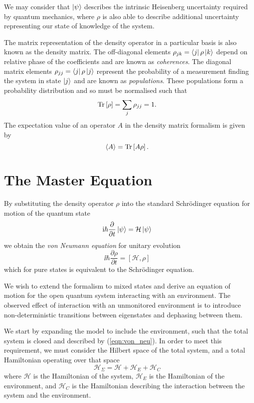     We may consider that $\Ket{\psi}$ describes the intrinsic Heisenberg
    uncertainty required by quantum mechanics, where $\rho$ is also able to
    describe additional uncertainty representing our state of knowledge of the
    system.\cite{Steck2007}

    The matrix representation of the density operator in a particular basis is
    also known as the density matrix. The off-diagonal elements $\rho_{jk} =
    \Bra{j} \rho \Ket{k}$ depend on relative phase of the coefficients and are
    known as \textit{coherences}. The diagonal matrix elements $\rho_{jj} =
    \Bra{j} \rho \Ket{j}$ represent the probability of a measurement finding the
    system in state $\Ket{j}$ and are known as \textit{populations}. These
    populations form a probability distribution and so must be normalised such
    that
    \begin{equation}
      \operatorname{Tr}\left[{\rho}\right] = \sum_j{\rho_{jj}} = 1.
    \end{equation}
    The expectation value of an operator $A$ in the density matrix formalism is
    given by
    \begin{equation}\label{eqn:density_matrix_exp_value}
      \langle A \rangle = \operatorname{Tr} \left[{A \rho} \right].
    \end{equation}

  \section{The Master Equation}

    By substituting the density operator $\rho$ into the standard Schr\"{o}dinger equation for motion of the quantum state
    $$
      \mathrm{i} \hbar \frac{\partial}{\partial t} \ket{\psi} = \mathcal{H} \ket{\psi}
    $$
    we obtain the \textit{von Neumann equation} for unitary evolution
    \begin{equation}
      \ii \hbar \frac{\partial \rho}{\partial t} = [\mathcal{H}, \rho]
      \label{eqn:von_neu}
    \end{equation}
    which for pure states is equivalent to the Schr\"{o}dinger equation.

    We wish to extend the formalism to mixed states and derive an equation of
    motion for the open quantum system interacting with an environment. The
    observed effect of interaction with an unmonitored environment is to
    introduce non-deterministic transitions between eigenstates and dephasing
    between them.

    We start by expanding the model to include the environment, such that the
    total system is closed and described by (\ref{eqn:von_neu}). In order to
    meet this requirement, we must consider the Hilbert space of the total
    system,  and a total Hamiltonian operating over that space
    \begin{equation}
      \mathcal{H}_\Sigma = \mathcal{H} + \mathcal{H}_E + \mathcal{H}_C
    \end{equation}
    where $\mathcal{H}$ is the Hamiltonian of the system, $\mathcal{H}_E$ is the
    Hamiltonian of the environment, and $\mathcal{H}_C$ is the Hamiltonian
    describing the interaction between the system and the environment.

